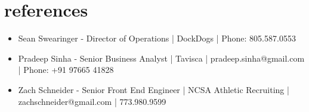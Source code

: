 \documentclass[legalpaper]{twentysecondcv} %
\begin{document}








\newpage %

\makeprofile %




\section{references}


   \begin{itemize}
	\item Sean Swearinger - Director of Operations | DockDogs | Phone: 805.587.0553
    \item Pradeep Sinha - Senior Business Analyst | Tavisca | pradeep.sinha@gmail.com | Phone: +91 97665 41828
    \item Zach Schneider - Senior Front End Engineer | NCSA Athletic Recruiting | zachschneider@gmail.com | 773.980.9599
\end{itemize}
\end{document}
